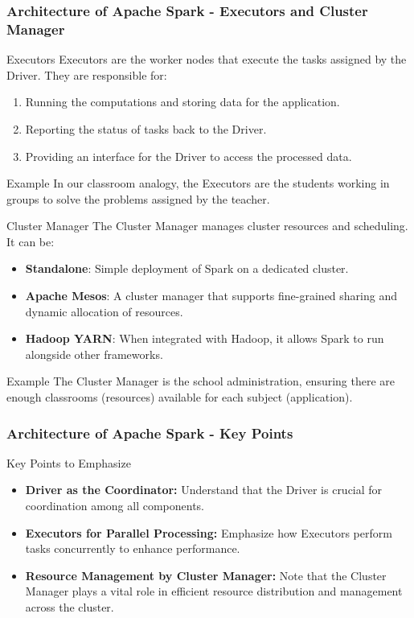 \documentclass{beamer}
\begin{document}
\begin{frame}[fragile]
    \frametitle{Architecture of Apache Spark - Executors and Cluster Manager}
    \begin{block}{Executors}
        Executors are the worker nodes that execute the tasks assigned by the Driver. They are responsible for:
        \begin{enumerate}
            \item Running the computations and storing data for the application.
            \item Reporting the status of tasks back to the Driver.
            \item Providing an interface for the Driver to access the processed data.
        \end{enumerate}
        \begin{block}{Example}
            In our classroom analogy, the Executors are the students working in groups to solve the problems assigned by the teacher.
        \end{block}
    \end{block}

    \begin{block}{Cluster Manager}
        The Cluster Manager manages cluster resources and scheduling. It can be:
        \begin{itemize}
            \item \textbf{Standalone}: Simple deployment of Spark on a dedicated cluster.
            \item \textbf{Apache Mesos}: A cluster manager that supports fine-grained sharing and dynamic allocation of resources.
            \item \textbf{Hadoop YARN}: When integrated with Hadoop, it allows Spark to run alongside other frameworks.
        \end{itemize}
        \begin{block}{Example}
            The Cluster Manager is the school administration, ensuring there are enough classrooms (resources) available for each subject (application).
        \end{block}
    \end{block}
\end{frame}

\begin{frame}[fragile]
    \frametitle{Architecture of Apache Spark - Key Points}
    \begin{block}{Key Points to Emphasize}
        \begin{itemize}
            \item \textbf{Driver as the Coordinator:} Understand that the Driver is crucial for coordination among all components.
            \item \textbf{Executors for Parallel Processing:} Emphasize how Executors perform tasks concurrently to enhance performance.
            \item \textbf{Resource Management by Cluster Manager:} Note that the Cluster Manager plays a vital role in efficient resource distribution and management across the cluster.
        \end{itemize}
    \end{block}
\end{frame}
\end{document}
